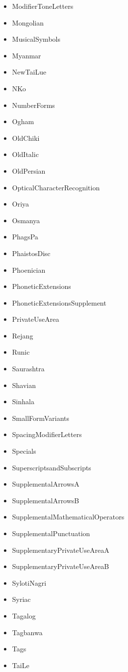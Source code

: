 ﻿\documentclass{article}
\newenvironment{itemlist}{%
  \begin{itemize}
	\setlength{\itemsep}{0pt}
	\setlength{\parsep}{0pt}
	\setlength{\topsep}{0pt}
	\setlength{\partopsep}{0pt}
	\setlength{\parskip}{0pt}
	\setlength{\labelsep}{5pt}}%
{
  \end{itemize}}
\begin{document}
\begin{multicols}{2}
\begin{itemlist}
				\item ModifierToneLetters
				\item Mongolian
				\item MusicalSymbols
				\item Myanmar
				\item NewTaiLue
				\item NKo
				\item NumberForms
				\item Ogham
				\item OldChiki
				\item OldItalic
				\item OldPersian
				\item OpticalCharacterRecognition
				\item Oriya
				\item Osmanya
				\item PhagsPa
				\item PhaistosDisc
				\item Phoenician
				\item PhoneticExtensions
				\item PhoneticExtensionsSupplement
				\item PrivateUseArea
				\item Rejang
				\item Runic
				\item Saurashtra
				\item Shavian
				\item Sinhala
				\item SmallFormVariants
				\item SpacingModifierLetters
				\item Specials
				\item SuperscriptsandSubscripts
				\item SupplementalArrowsA
				\item SupplementalArrowsB
				\item SupplementalMathematicalOperators
				\item SupplementalPunctuation
				\item SupplementaryPrivateUseAreaA
				\item SupplementaryPrivateUseAreaB
				\item SylotiNagri
				\item Syriac
				\item Tagalog
				\item Tagbanwa
				\item Tags
				\item TaiLe

\end{itemlist}
\end{multicols}
\end{document}
